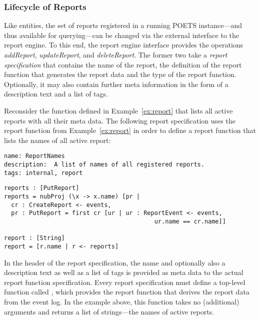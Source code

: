 \subsubsection{Lifecycle of Reports}
\label{sec:lifecycle-reports}

Like entities, the set of reports registered in a running POETS
instance---and thus available for querying---can be changed via the
external interface to the report engine. To this end, the report engine
interface provides the operations \emph{addReport},
\emph{updateReport}, and \emph{deleteReport}. The former two take a
\emph{report specification} that contains the name of the report, the
definition of the report function that generates the report data and
the type of the report function. Optionally, it may also contain
further meta information in the form of a description text and a list
of tags.

\begin{example}
\label{ex:reportSpec}
Reconsider the function defined in Example~\ref{ex:report} that lists
all active reports with all their meta data. The following report
specification uses the report function from Example~\ref{ex:report} in
order to define a report function that lists the names of all active
report:

\begin{lstlisting}[language=parrotprelude,basicstyle=\normalsize]
name: ReportNames
description:  A list of names of all registered reports.
tags: internal, report
\end{lstlisting}
\begin{lstlisting}[language=parrot,basicstyle=\normalsize]
reports : [PutReport]
reports = nubProj (\x -> x.name) [pr |
  cr : CreateReport <- events,
  pr : PutReport = first cr [ur | ur : ReportEvent <- events,
                                          ur.name == cr.name]]

report : [String]
report = [r.name | r <- reports]
\end{lstlisting}
\end{example}
In the header of the report specification, the name and optionally
also a description text as well as a list of tags is provided as meta
data to the actual report function specification. Every report
specification must define a top-level function called ,
which provides the report function that derives the report data from
the event log. In the example above, this function takes no
(additional) arguments and returns a list of strings---the names of
active reports.

